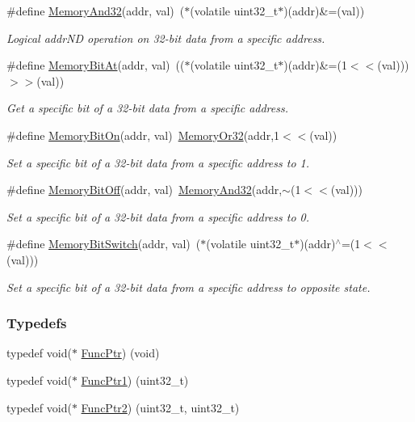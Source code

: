\begin{DoxyCompactItemize}
\#define \mbox{\hyperlink{a00020_ad87cedffcaadc51db22594fce55173d4}{Memory\+And32}}(addr,  val)~($\ast$(volatile uint32\+\_\+t$\ast$)(addr)\&=(val))
\begin{DoxyCompactList}\small\item\em Logical addr\+ND operation on 32-\/bit data from a specific address. \end{DoxyCompactList}\item 
\#define \mbox{\hyperlink{a00020_afc530c7e6b49b0ca97c1ad9dac1c4750}{Memory\+Bit\+At}}(addr,  val)~(($\ast$(volatile uint32\+\_\+t$\ast$)(addr)\&=(1$<$$<$(val)))$>$$>$(val))
\begin{DoxyCompactList}\small\item\em Get a specific bit of a 32-\/bit data from a specific address. \end{DoxyCompactList}\item 
\#define \mbox{\hyperlink{a00020_a99a602346038b54068758ef00c42d1b6}{Memory\+Bit\+On}}(addr,  val)~\mbox{\hyperlink{a00020_a27874a97deab7cecdde5ddecf466e31e}{Memory\+Or32}}(addr,1$<$$<$(val))
\begin{DoxyCompactList}\small\item\em Set a specific bit of a 32-\/bit data from a specific address to 1. \end{DoxyCompactList}\item 
\#define \mbox{\hyperlink{a00020_a04c34919a950117ae7da2dc5a235622b}{Memory\+Bit\+Off}}(addr,  val)~\mbox{\hyperlink{a00020_ad87cedffcaadc51db22594fce55173d4}{Memory\+And32}}(addr,$\sim$(1$<$$<$(val)))
\begin{DoxyCompactList}\small\item\em Set a specific bit of a 32-\/bit data from a specific address to 0. \end{DoxyCompactList}\item 
\#define \mbox{\hyperlink{a00020_ae49e41753dbce64185d380d307ade78d}{Memory\+Bit\+Switch}}(addr,  val)~($\ast$(volatile uint32\+\_\+t$\ast$)(addr)$^\wedge$=(1$<$$<$(val)))
\begin{DoxyCompactList}\small\item\em Set a specific bit of a 32-\/bit data from a specific address to opposite state. \end{DoxyCompactList}\end{DoxyCompactItemize}
\subsubsection*{Typedefs}
\begin{DoxyCompactItemize}
\item 
typedef void($\ast$ \mbox{\hyperlink{a00020_a3d987633d7a3ca10c14905a807b62eb1}{Func\+Ptr}}) (void)
\item 
typedef void($\ast$ \mbox{\hyperlink{a00020_a0891965816a5b721b07f7bebefaf7430}{Func\+Ptr1}}) (uint32\+\_\+t)
\item 
typedef void($\ast$ \mbox{\hyperlink{a00020_a331a88eeefe11112bb8fe1b43dd777b8}{Func\+Ptr2}}) (uint32\+\_\+t, uint32\+\_\+t)
\end{DoxyCompactItemize}
